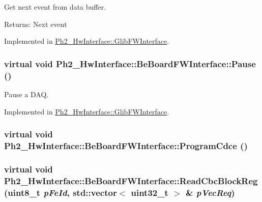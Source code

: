 Get next event from data buffer. 

\begin{Desc}
\item[Returns:]Next event \end{Desc}


Implemented in \hyperlink{class_ph2___hw_interface_1_1_glib_f_w_interface_091f683a54134b92837344da3b3e6eae}{Ph2\_\-Hw\-Interface::Glib\-FWInterface}.\hypertarget{class_ph2___hw_interface_1_1_be_board_f_w_interface_a943bad9e1dc079d2f4244f749695bd1}{
\subsubsection[Pause]{\setlength{\rightskip}{0pt plus 5cm}virtual void Ph2\_\-Hw\-Interface::Be\-Board\-FWInterface::Pause ()}}
\label{class_ph2___hw_interface_1_1_be_board_f_w_interface_a943bad9e1dc079d2f4244f749695bd1}


Pause a DAQ. 



Implemented in \hyperlink{class_ph2___hw_interface_1_1_glib_f_w_interface_05d7f790e0316b51714293e8089086f3}{Ph2\_\-Hw\-Interface::Glib\-FWInterface}.\hypertarget{class_ph2___hw_interface_1_1_be_board_f_w_interface_9575de192b6dd5613857ce255ec6947b}{
\subsubsection[ProgramCdce]{\setlength{\rightskip}{0pt plus 5cm}virtual void Ph2\_\-Hw\-Interface::Be\-Board\-FWInterface::Program\-Cdce ()}}
\label{class_ph2___hw_interface_1_1_be_board_f_w_interface_9575de192b6dd5613857ce255ec6947b}


\hypertarget{class_ph2___hw_interface_1_1_be_board_f_w_interface_c88ca7560104bf438fb1e57f1ce089f1}{
\subsubsection[ReadCbcBlockReg]{\setlength{\rightskip}{0pt plus 5cm}virtual void Ph2\_\-Hw\-Interface::Be\-Board\-FWInterface::Read\-Cbc\-Block\-Reg (uint8\_\-t {\em p\-Fe\-Id}, std::vector$<$ uint32\_\-t $>$ \& {\em p\-Vec\-Req})}}
\label{class_ph2___hw_interface_1_1_be_board_f_w_interface_c88ca7560104bf438fb1e57f1ce089f1}


